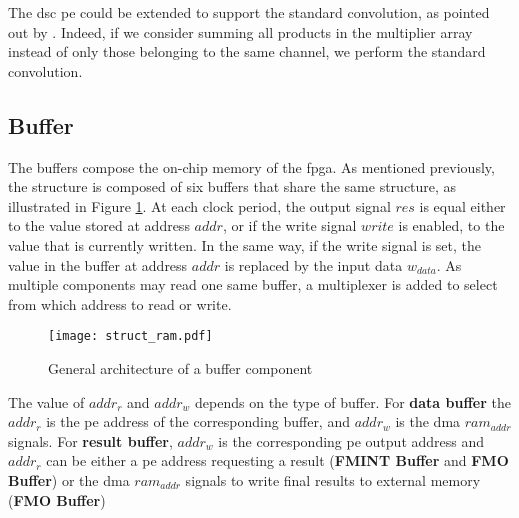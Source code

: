 The \acrshort{dsc} \acrshort{pe} could be extended to support the standard convolution, as pointed out by \textcite{bai_cnn_2018}. Indeed, if we consider summing all products in the multiplier array instead of only those belonging to the same channel, we perform the standard convolution.
%
\subsection{Buffer}
%
The buffers compose the on-chip memory of the \acrshort{fpga}. As mentioned previously, the structure is composed of six buffers that share the same structure, as illustrated in Figure \ref{fig:struct_ram}. At each clock period, the output signal $res$ is equal either to the value stored at address $addr$, or if the write signal $write$ is enabled, to the value that is currently written. In the same way, if the write signal is set, the value in the buffer at address $addr$ is replaced by the input data $w_{data}$. As multiple components may read one same buffer, a multiplexer is added to select from which address to read or write.
%
\begin{figure}[H]
    \centering
    \texttt{[image: struct\_ram.pdf]}
    \caption{General architecture of a buffer component}
    \label{fig:struct_ram}
\end{figure}
%
The value of $addr_r$ and $addr_w$ depends on the type of buffer. For \textbf{data buffer} the $addr_r$ is the \acrshort{pe} address of the corresponding buffer, and $addr_w$ is the \acrshort{dma} $ram_{addr}$ signals. For \textbf{result buffer}, $addr_w$ is the corresponding \acrshort{pe} output address and $addr_r$ can be either a \acrshort{pe} address requesting a result (\textbf{FMINT Buffer} and \textbf{FMO Buffer}) or the \acrshort{dma} $ram_{addr}$ signals to write final results to external memory (\textbf{FMO Buffer})

